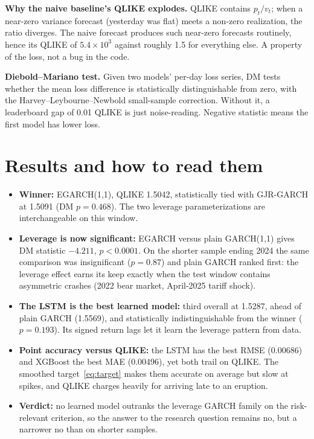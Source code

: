 \documentclass[a4paper,11pt]{article}
\newcommand{\term}[1]{\textbf{#1}}
\begin{document}
\term{Why the naive baseline's QLIKE explodes.} QLIKE contains $p_t/v_t$; when a near-zero variance forecast (yesterday was flat) meets a non-zero realization, the ratio diverges. The naive forecast produces such near-zero forecasts routinely, hence its QLIKE of $5.4\times10^{3}$ against roughly 1.5 for everything else. A property of the loss, not a bug in the code.

\term{Diebold–Mariano test.} Given two models' per-day loss series, DM tests whether the mean loss difference is statistically distinguishable from zero, with the Harvey–Leybourne–Newbold small-sample correction. Without it, a leaderboard gap of 0.01 QLIKE is just noise-reading. Negative statistic means the first model has lower loss.

\section{Results and how to read them}

\begin{itemize}[itemsep=2pt]
\item \term{Winner:} EGARCH(1,1), QLIKE 1.5042, statistically tied with GJR-GARCH at 1.5091 (DM $p=0.468$). The two leverage parameterizations are interchangeable on this window.
\item \term{Leverage is now significant:} EGARCH versus plain GARCH(1,1) gives DM statistic $-4.211$, $p<0.0001$. On the shorter sample ending 2024 the same comparison was insignificant ($p=0.87$) and plain GARCH ranked first: the leverage effect earns its keep exactly when the test window contains asymmetric crashes (2022 bear market, April-2025 tariff shock).
\item \term{The LSTM is the best learned model:} third overall at 1.5287, ahead of plain GARCH (1.5569), and statistically indistinguishable from the winner ($p=0.193$). Its signed return lags let it learn the leverage pattern from data.
\item \term{Point accuracy versus QLIKE:} the LSTM has the best RMSE (0.00686) and XGBoost the best MAE (0.00496), yet both trail on QLIKE. The smoothed target~\eqref{eq:target} makes them accurate on average but slow at spikes, and QLIKE charges heavily for arriving late to an eruption.
\item \term{Verdict:} no learned model outranks the leverage GARCH family on the risk-relevant criterion, so the answer to the research question remains no, but a narrower no than on shorter samples.
\end{itemize}
\end{document}
